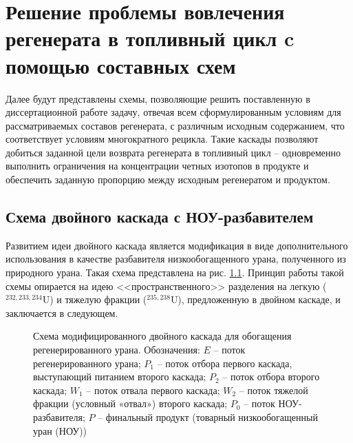 

\chapter{Решение проблемы вовлечения регенерата в топливный цикл c помощью составных схем}\label{ch:ch3}

Далее будут представлены схемы, позволяющие решить поставленную в диссертационной работе задачу, отвечая всем сформулированным условиям для рассматриваемых составов регенерата, с различным исходным содержанием, что соответствует условиям многократного рецикла. Такие каскады позволяют добиться заданной цели возврата регенерата в топливный цикл -- одновременно выполнить ограничения на концентрации четных изотопов в продукте и обеспечить заданную пропорцию между исходным регенератом и продуктом.

\section{Схема двойного каскада с НОУ-разбавителем}

Развитием идеи двойного каскада является модификация в виде дополнительного использования в качестве разбавителя низкообогащенного урана, полученного из природного урана. Такая схема представлена на рис. \ref{p2left}. Принцип работы такой схемы опирается на идею <<пространственного>> разделения на легкую ($^{232,233,234}$U) и тяжелую фракции ($^{235,238}$U), предложенную в двойном каскаде, и заключается в следующем. 

\begin{figure}[ht]
    \caption{Схема модифицированного двойного каскада для обогащения регенерированного урана. Обозначения: $E$ -- поток регенерированного урана; $P_1$ -- поток отбора первого каскада, выступающий питанием второго каскада; $P_2$ -- поток отбора второго каскада; $W_1$ -- поток отвала первого каскада; $W_2$ -- поток тяжелой фракции (условный «отвал») второго каскада; $P_0$ -- поток НОУ-разбавителя; $P$ -- финальный продукт (товарный низкообогащенный уран (НОУ))}\label{p2left}
\end{figure}

